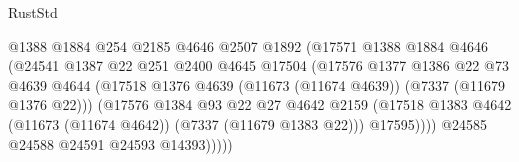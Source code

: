 \begin{lexlean}{RustStd}
\begin{coremodule}
                                          @1388
                                          @1884
                                          @254
                                          @2185
                                          @4646
                                          @2507
                                          @1892
                                          (@17571
                                            @1388
                                            @1884
                                            @4646
                                            (@24541
                                              @1387
                                              @22
                                              @251
                                              @2400
                                              @4645
                                              @17504
                                              (@17576
                                                @1377
                                                @1386
                                                @22
                                                @73
                                                @4639
                                                @4644
                                                (@17518
                                                  @1376
                                                  @4639
                                                  (@11673 (@11674 @4639))
                                                  (@7337 (@11679 @1376 @22)))
                                                (@17576
                                                  @1384
                                                  @93
                                                  @22
                                                  @27
                                                  @4642
                                                  @2159
                                                  (@17518
                                                    @1383
                                                    @4642
                                                    (@11673 (@11674 @4642))
                                                    (@7337 (@11679 @1383 @22)))
                                                  @17595))))
                                          @24585
                                          @24588
                                          @24591
                                          @24593
                                          @14393)))))

\end{coremodule}
\end{lexlean}

